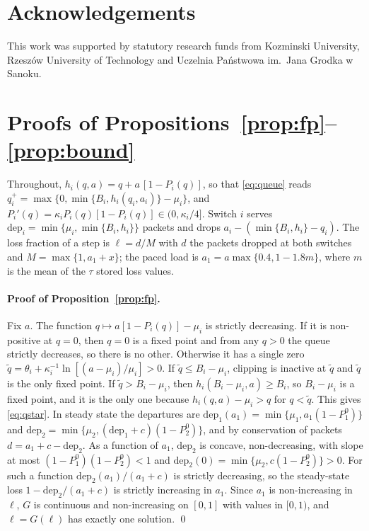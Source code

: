 \documentclass[11pt,a4paper]{article}
\begin{document}
\section*{Acknowledgements}
This work was supported by statutory research funds from Kozminski University, Rzesz{\'o}w University of Technology and Uczelnia Pa{\'n}stwowa im.\ Jana Grodka w Sanoku.



\appendix
\section{Proofs of Propositions~\ref{prop:fp}--\ref{prop:bound}}
\label{app:proofs}

Throughout, $h_i(q,a)=q+a\,[1-P_i(q)]$, so that \eqref{eq:queue} reads $q_i^+=\max\{0,\min\{B_i,h_i(q_i,a_i)\}-\mu_i\}$, and $P_i'(q)=\kappa_iP_i(q)[1-P_i(q)]\in(0,\kappa_i/4]$. Switch $i$ serves $\mathrm{dep}_i=\min\{\mu_i,\min\{B_i,h_i\}\}$ packets and drops $a_i-(\min\{B_i,h_i\}-q_i)$. The loss fraction of a step is $\ell=d/M$ with $d$ the packets dropped at both switches and $M=\max\{1,a_1+x\}$; the paced load is $a_1=a\max\{0.4,1-1.8m\}$, where $m$ is the mean of the $\tau$ stored loss values.

\paragraph{Proof of Proposition~\ref{prop:fp}.}
Fix $a$. The function $q\mapsto a[1-P_i(q)]-\mu_i$ is strictly decreasing. If it is non-positive at $q=0$, then $q=0$ is a fixed point and from any $q>0$ the queue strictly decreases, so there is no other. Otherwise it has a single zero $\tilde q=\theta_i+\kappa_i^{-1}\ln[(a-\mu_i)/\mu_i]>0$. If $\tilde q\le B_i-\mu_i$, clipping is inactive at $\tilde q$ and $\tilde q$ is the only fixed point. If $\tilde q>B_i-\mu_i$, then $h_i(B_i-\mu_i,a)\ge B_i$, so $B_i-\mu_i$ is a fixed point, and it is the only one because $h_i(q,a)-\mu_i>q$ for $q<\tilde q$. This gives \eqref{eq:qstar}. In steady state the departures are $\mathrm{dep}_1(a_1)=\min\{\mu_1,a_1(1-P_1^0)\}$ and $\mathrm{dep}_2=\min\{\mu_2,(\mathrm{dep}_1+c)(1-P_2^0)\}$, and by conservation of packets $d=a_1+c-\mathrm{dep}_2$. As a function of $a_1$, $\mathrm{dep}_2$ is concave, non-decreasing, with slope at most $(1-P_1^0)(1-P_2^0)<1$ and $\mathrm{dep}_2(0)=\min\{\mu_2,c(1-P_2^0)\}>0$. For such a function $\mathrm{dep}_2(a_1)/(a_1+c)$ is strictly decreasing, so the steady-state loss $1-\mathrm{dep}_2/(a_1+c)$ is strictly increasing in $a_1$. Since $a_1$ is non-increasing in $\ell$, $G$ is continuous and non-increasing on $[0,1]$ with values in $[0,1)$, and $\ell=G(\ell)$ has exactly one solution. \qed
\end{document}
